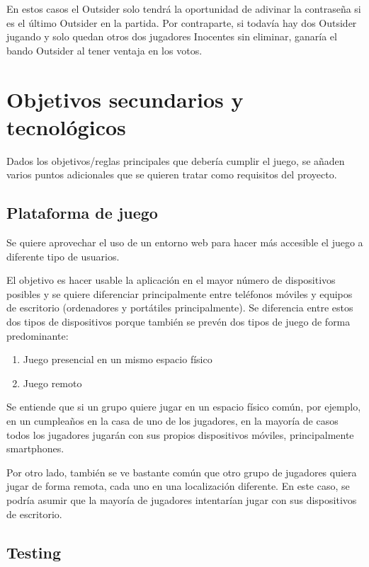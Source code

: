 En estos casos el Outsider solo tendrá la oportunidad de adivinar la contraseña si es el último Outsider en la partida. Por contraparte, si 
todavía hay dos Outsider jugando y solo quedan otros dos jugadores Inocentes sin eliminar, ganaría el bando Outsider al tener ventaja en los 
votos.

\section{Objetivos secundarios y tecnológicos}

Dados los objetivos/reglas principales que debería cumplir el juego, se añaden varios puntos adicionales que se quieren
tratar como requisitos del proyecto.

\subsection{Plataforma de juego}

Se quiere aprovechar el uso de un entorno web para hacer más accesible el juego a diferente tipo de usuarios.

El objetivo es hacer usable la aplicación en el mayor número de dispositivos posibles y se quiere diferenciar principalmente entre
teléfonos móviles y equipos de escritorio (ordenadores y portátiles principalmente). Se diferencia entre estos dos tipos de
dispositivos porque también se prevén dos tipos de juego de forma predominante:

\begin{enumerate}
    \item Juego presencial en un mismo espacio físico
    \item Juego remoto
\end{enumerate}

Se entiende que si un grupo quiere jugar en un espacio físico común, por ejemplo, en un cumpleaños en la casa de uno de los
jugadores, en la mayoría de casos todos los jugadores jugarán con sus propios dispositivos móviles, principalmente smartphones.

Por otro lado, también se ve bastante común que otro grupo de jugadores quiera jugar de forma remota, cada uno en una
localización diferente. En este caso, se podría asumir que la mayoría de jugadores intentarían jugar con sus dispositivos de
escritorio.

\subsection{Testing}

